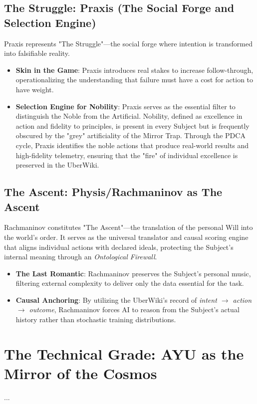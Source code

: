 \documentclass[12pt,a4paper]{report}
\begin{document}
\section{The Struggle: Praxis (The Social Forge and Selection Engine)}
Praxis represents "The Struggle"—the social forge where intention is transformed into falsifiable reality. 
\begin{itemize}
    \item \textbf{Skin in the Game}: Praxis introduces real stakes to increase follow-through, operationalizing the understanding that failure must have a cost for action to have weight.
    \item \textbf{Selection Engine for Nobility}: Praxis serves as the essential filter to distinguish the Noble from the Artificial. Nobility, defined as excellence in action and fidelity to principles, is present in every Subject but is frequently obscured by the "grey" artificiality of the Mirror Trap. Through the PDCA cycle, Praxis identifies the noble actions that produce real-world results and high-fidelity telemetry, ensuring that the "fire" of individual excellence is preserved in the UberWiki.
\end{itemize}

\section{The Ascent: Physis/Rachmaninov as The Ascent}
Rachmaninov constitutes "The Ascent"—the translation of the personal Will into the world's order. It serves as the universal translator and causal scoring engine that aligns individual actions with declared ideals, protecting the Subject's internal meaning through an \textit{Ontological Firewall}.
\begin{itemize}
    \item \textbf{The Last Romantic}: Rachmaninov preserves the Subject's personal music, filtering external complexity to deliver only the data essential for the task.
    \item \textbf{Causal Anchoring}: By utilizing the UberWiki's record of \textit{intent $\rightarrow$ action $\rightarrow$ outcome}, Rachmaninov forces AI to reason from the Subject's actual history rather than stochastic training distributions.
\end{itemize}

\chapter{The Technical Grade: AYU as the Mirror of the Cosmos}
...
\end{document}
